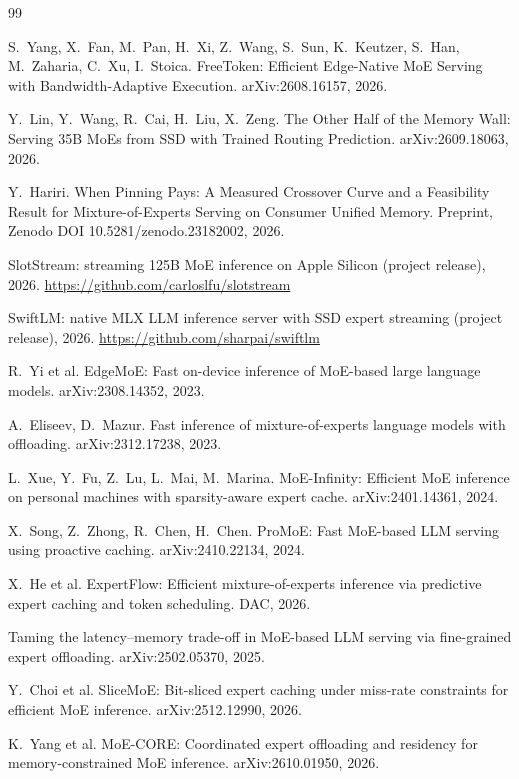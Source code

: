\documentclass[11pt]{article}
\begin{document}
\begin{thebibliography}{99}
\small

 S.~Yang, X.~Fan, M.~Pan, H.~Xi, Z.~Wang, S.~Sun,
K.~Keutzer, S.~Han, M.~Zaharia, C.~Xu, I.~Stoica. FreeToken: Efficient
Edge-Native MoE Serving with Bandwidth-Adaptive Execution. arXiv:2608.16157,
2026.

 Y.~Lin, Y.~Wang, R.~Cai, H.~Liu, X.~Zeng. The Other Half of
the Memory Wall: Serving 35B MoEs from SSD with Trained Routing Prediction.
arXiv:2609.18063, 2026.

 Y.~Hariri. When Pinning Pays: A Measured
Crossover Curve and a Feasibility Result for Mixture-of-Experts Serving on
Consumer Unified Memory. Preprint, Zenodo DOI 10.5281/zenodo.23182002, 2026.

 SlotStream: streaming 125B MoE inference on Apple
Silicon (project release), 2026. \url{https://github.com/carloslfu/slotstream}

 SwiftLM: native MLX LLM inference server with SSD expert
streaming (project release), 2026.
\url{https://github.com/sharpai/swiftlm}

 R.~Yi et al. EdgeMoE: Fast on-device inference of MoE-based
large language models. arXiv:2308.14352, 2023.

 A.~Eliseev, D.~Mazur. Fast inference of
mixture-of-experts language models with offloading. arXiv:2312.17238, 2023.

 L.~Xue, Y.~Fu, Z.~Lu, L.~Mai, M.~Marina. MoE-Infinity:
Efficient MoE inference on personal machines with sparsity-aware expert
cache. arXiv:2401.14361, 2024.

 X.~Song, Z.~Zhong, R.~Chen, H.~Chen. ProMoE: Fast MoE-based
LLM serving using proactive caching. arXiv:2410.22134, 2024.

 X.~He et al. ExpertFlow: Efficient mixture-of-experts
inference via predictive expert caching and token scheduling. DAC, 2026.

 Taming the latency--memory trade-off in MoE-based LLM
serving via fine-grained expert offloading. arXiv:2502.05370, 2025.

 Y.~Choi et al. SliceMoE: Bit-sliced expert caching under
miss-rate constraints for efficient MoE inference. arXiv:2512.12990, 2026.

 K.~Yang et al. MoE-CORE: Coordinated expert offloading and
residency for memory-constrained MoE inference. arXiv:2610.01950, 2026.


\end{thebibliography}
\end{document}
